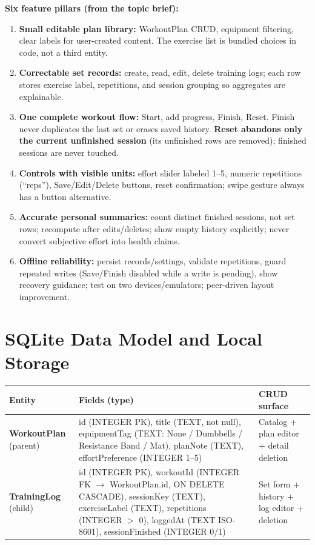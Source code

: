 \documentclass[11pt]{article}
\begin{document}
\medskip
\noindent\textbf{Six feature pillars (from the topic brief):}
\begin{enumerate}
  \item \textbf{Small editable plan library:} WorkoutPlan CRUD, equipment filtering, clear labels for user-created content. The exercise list is bundled choices in code, not a third entity.
  \item \textbf{Correctable set records:} create, read, edit, delete training logs; each row stores exercise label, repetitions, and session grouping so aggregates are explainable.
  \item \textbf{One complete workout flow:} Start, add progress, Finish, Reset. Finish never duplicates the last set or erases saved history. \textbf{Reset abandons only the current unfinished session} (its unfinished rows are removed); finished sessions are never touched.
  \item \textbf{Controls with visible units:} effort slider labeled 1--5, numeric repetitions (``reps''), Save/Edit/Delete buttons, reset confirmation; swipe gesture always has a button alternative.
  \item \textbf{Accurate personal summaries:} count distinct finished sessions, not set rows; recompute after edits/deletes; show empty history explicitly; never convert subjective effort into health claims.
  \item \textbf{Offline reliability:} persist records/settings, validate repetitions, guard repeated writes (Save/Finish disabled while a write is pending), show recovery guidance; test on two devices/emulators; peer-driven layout improvement.
\end{enumerate}

\section{SQLite Data Model and Local Storage}

\begin{tabularx}{\textwidth}{@{}P{3.2cm}L P{4.2cm}@{}}
\toprule
\textbf{Entity} & \textbf{Fields (type)} & \textbf{CRUD surface} \\
\midrule
\textbf{WorkoutPlan} (parent) & id (INTEGER PK), title (TEXT, not null), equipmentTag (TEXT: None / Dumbbells / Resistance Band / Mat), planNote (TEXT), effortPreference (INTEGER 1--5) & Catalog + plan editor + detail deletion \\
\textbf{TrainingLog} (child) & id (INTEGER PK), workoutId (INTEGER FK $\rightarrow$ WorkoutPlan.id, ON DELETE CASCADE), sessionKey (TEXT), exerciseLabel (TEXT), repetitions (INTEGER $>$ 0), loggedAt (TEXT ISO-8601), sessionFinished (INTEGER 0/1) & Set form + history + log editor + deletion \\
\bottomrule
\end{tabularx}
\end{document}

